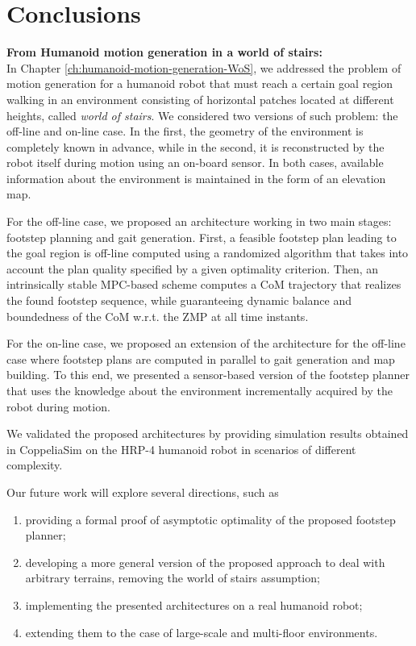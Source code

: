 \chapter{Conclusions}
\textbf{From Humanoid motion generation in a world of stairs:}\\
In Chapter \ref{ch:humanoid-motion-generation-WoS},
we addressed the problem of motion generation for a humanoid
robot that must reach a certain goal region walking in an environment consisting
of horizontal patches located at different heights, called \textit{world of stairs}.
We considered two versions of such problem: the off-line and on-line case. 
In the first, the geometry of the environment is completely known in advance,
while in the second, it is reconstructed by the robot itself during motion using
an on-board sensor. In both cases, available information about the environment
is maintained in the form of an elevation map. 

For the off-line case, we proposed an architecture working in two main stages:
footstep planning and gait generation.
First, a feasible footstep plan leading to the goal region is off-line computed
using a randomized algorithm that takes into account the plan quality specified
by a given optimality criterion.
Then, an intrinsically stable MPC-based scheme computes a CoM trajectory that
realizes the found footstep sequence, while guaranteeing dynamic balance and
boundedness of the CoM w.r.t. the ZMP at all time instants.

For the on-line case, we proposed an extension of the architecture for the
off-line case where footstep plans are computed in parallel to gait generation
and map building.
To this end, we presented a sensor-based version of the footstep planner that
uses the knowledge about the environment incrementally acquired by the robot
during motion.

We validated  the proposed architectures by providing simulation results
obtained in CoppeliaSim on the HRP-4 humanoid robot in scenarios of different
complexity.

Our future work will explore several directions, such as
\begin{enumerate}
    \item providing a formal proof of asymptotic optimality of the proposed
        footstep planner;
    \item developing a more general version of the proposed approach to deal
        with arbitrary terrains, removing the world of stairs assumption;
    \item implementing the presented architectures on a real humanoid robot;
    \item extending them to the case of large-scale and multi-floor environments.
\end{enumerate}

